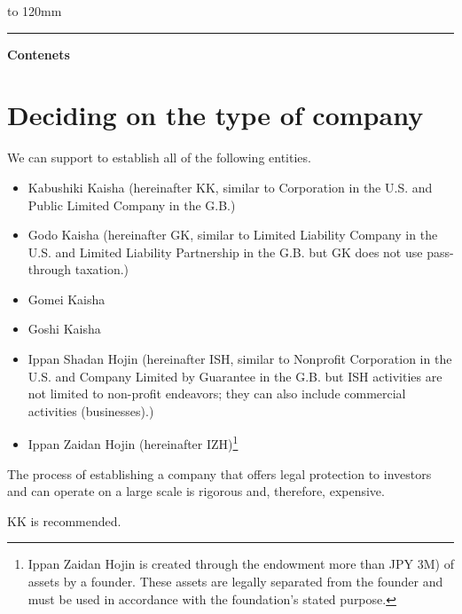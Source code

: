  \renewcommand{\headrulewidth}{11pt}%
 \hbox to 120mm{%
 \color{dominant} \leaders\hrule height11pt\hfil}


\vspace{18mm}
{\color{dominant} \LARGE \bfseries Contenets}
\vspace{-5mm}
\setcounter{tocdepth}{2}
\tableofcontents
\clearpage

\vspace{-20pt}


\section{Deciding on the type of company}

\begin{coloritemize}
\item We can support to establish all of the following entities.
 \begin{itemize}
 \item Kabushiki Kaisha (hereinafter KK, similar to Corporation in the U.S. and Public Limited Company in the G.B.)
 \item Godo Kaisha (hereinafter GK, similar to Limited Liability Company in the U.S. and Limited Liability Partnership in the G.B. but GK does not use pass-through taxation.)
 \item Gomei Kaisha
 \item Goshi Kaisha
 \item Ippan Shadan Hojin (hereinafter ISH, similar to Nonprofit Corporation in the U.S. and Company Limited by Guarantee in the G.B. but ISH activities are not limited to non-profit endeavors; they can also include commercial activities (businesses).)
 \item Ippan Zaidan Hojin (hereinafter IZH)\footnote{Ippan Zaidan Hojin is created through the endowment more than JPY 3M) of assets by a founder. These assets are legally separated from the founder and must be used in accordance with the foundation’s stated purpose.}
 \end{itemize}
\item The process of establishing a company that offers legal protection to investors and can operate on a large scale is rigorous and, therefore, expensive.
\item KK is recommended.
\end{coloritemize}

